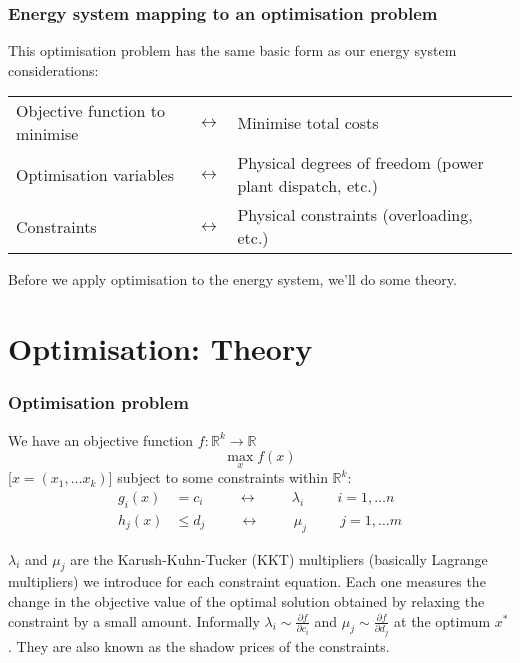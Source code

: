 \documentclass[10pt,aspectratio=169,dvipsnames]{beamer}
\newcommand{\ra}[1]{\renewcommand{\arraystretch}{#1}}
\newcommand{\R}{\mathbb{R}}
\def\l{\lambda}
\def\m{\mu}
\def\d{\partial}
\begin{document}
\begin{frame}
  \frametitle{Energy system mapping to an optimisation problem}

  This optimisation problem has the same basic form as our energy system considerations:
  \ra{1.05}
  \begin{table}[!t]
    \begin{tabular}{p{6cm}p{0.5cm}p{6cm}}
      \toprule
      \alert{Objective function to minimise} & \vspace{.4cm}$\leftrightarrow$  &  \alert{Minimise total costs} \\
      \alert{Optimisation variables} & \vspace{.4cm} $\leftrightarrow$ &  \alert{Physical degrees of freedom (power plant dispatch, etc.)} \\
      \alert{Constraints} &\vspace{.4cm}  $\leftrightarrow$  &  \alert{Physical constraints (overloading, etc.)} \\
      \bottomrule
    \end{tabular}
  \end{table}

  Before we apply optimisation to the energy system, we'll do some \alert{theory}.

\end{frame}




\section{Optimisation: Theory}

\begin{frame}
  \frametitle{Optimisation problem}


We have an \alert{objective function} $f: \R^k \to \R$
\begin{equation*}
  \max_{x} f(x)
\end{equation*}
[$x = (x_1, \dots x_k)$] subject to some \alert{constraints} within $\R^k$:
\begin{align*}
  g_i(x) & = c_i \hspace{1cm}\leftrightarrow\hspace{1cm} \l_i \hspace{1cm} i = 1,\dots n \\
  h_j(x) & \leq d_j \hspace{1cm}\leftrightarrow\hspace{1cm} \m_j \hspace{1cm} j = 1,\dots m
\end{align*}

$\l_i$ and $\m_j$ are the \alert{Karush-Kuhn-Tucker (KKT) multipliers} (basically Lagrange multipliers) we introduce for
each constraint equation. Each one measures the change in the objective value of the optimal solution obtained by relaxing the constraint by a small amount. Informally $\l_i \sim \frac{\d f}{\d c_i}$ and $\m_j \sim \frac{\d f}{\d d_j}$ at the optimum $x^*$. They are also known as the \alert{shadow prices} of the constraints.

\end{frame}
\end{document}
